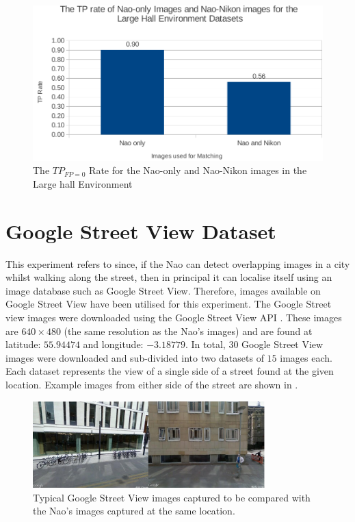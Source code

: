 \documentclass[11pt]{report}
\begin{document}
\begin{figure}[h!] 
  \centering
    \includegraphics[width=1.0\textwidth]{../Drawings/Graphs/tp_rate_nikon_lh.pdf}
    \caption{The $TP_{FP=0}$ Rate for the Nao-only and Nao-Nikon images in the Large hall Environment}
    \label{fig:tp_rate_nikon_lh}
\end{figure}
\section{Google Street View Dataset}
\label{sec:streetView}
This experiment refers to  since, if the Nao can detect overlapping images in a city whilst walking along the street, then in principal it can localise itself using an image database such as Google Street View. Therefore, images available on Google Street View have been utilised for this experiment. The Google Street view images were downloaded using the Google Street View API \citep{StreetView}. These images are $640 \times 480$ (the same resolution as the Nao's images) and are found at latitude: $55.94474$ and longitude: $-3.18779$. In total, $30$ Google Street View images were downloaded and sub-divided into two datasets of $15$ images each. Each dataset represents the view of a single side of a street found at the given location. Example images from either side of the street are shown in .\\

 \begin{figure}[h!] 
  \centering
    \includegraphics[width=0.8\textwidth]{../Drawings/streetView/googleStreetView.jpg}
    \caption{Typical Google Street View images captured to be compared with the Nao's images captured at the same location.}
    \label{fig:googleStreetImages}
\end{figure}
\end{document}
